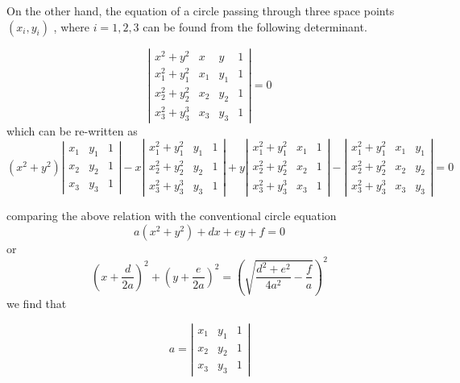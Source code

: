 On the other hand, the equation of a circle passing through three space points $(x_i,y_i)$ , where
$i=1,2,3$ can be found from the following determinant.

\begin{equation}
\left|
\begin{matrix}
x^2+y^2 & x & y & 1\\
x_1^2+y_1^2 & x_1 & y_1 & 1\\
x_2^2+y_2^2 & x_2 & y_2 & 1\\
x_3^2+y_3^3 & x_3 & y_3  & 1
\end{matrix}
\right|
=0
\end{equation}
which can be re-written as
\begin{equation}
(x^2+y^2)
\left|
\begin{matrix}
 x_1 & y_1 & 1\\
 x_2 & y_2 & 1\\
 x_3 & y_3 & 1
\end{matrix}
\right|
-x
\left|
\begin{matrix}
x_1^2+y_1^2 & y_1 & 1\\
x_2^2+y_2^2 & y_2 & 1\\
x_3^2+y_3^3 & y_3  & 1
\end{matrix}
\right|
+y
\left|
\begin{matrix}
x_1^2+y_1^2 & x_1 & 1\\
x_2^2+y_2^2 & x_2 & 1\\
x_3^2+y_3^3 & x_3 & 1
\end{matrix}
\right|
-
\left|
\begin{matrix}
x_1^2+y_1^2 & x_1 & y_1 \\
x_2^2+y_2^2 & x_2 & y_2 \\
x_3^2+y_3^3 & x_3 & y_3
\end{matrix}
\right|
=0
\end{equation}

comparing the above relation with the conventional circle equation
\begin{equation}
a(x^2+y^2)+dx+ey+f=0
\end{equation}
or
\begin{equation}
(x+\frac{d}{2a})^2+(y+\frac{e}{2a})^2=\left( \sqrt{\frac{d^2+e^2}{4a^2}-\frac{f}{a} } \right)^2
\end{equation}
we find that


\begin{equation}
a=
\left|
\begin{matrix}
 x_1 & y_1 & 1\\
 x_2 & y_2 & 1\\
 x_3 & y_3 & 1
\end{matrix}
\right|
\end{equation}


